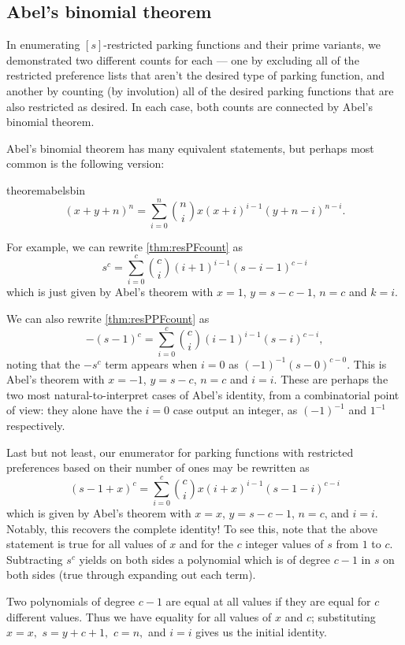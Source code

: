 \documentclass[12 pt]{amsart}
\theoremstyle{definition} %
\theoremstyle{remark} %
\begin{document}
\subsection{Abel's binomial theorem}

In enumerating $[s]$-restricted parking functions and their prime variants, we demonstrated two different counts for each --- one by excluding all of the restricted preference lists that aren't the desired type of parking function, and another by counting (by involution) all of the desired parking functions that are also restricted as desired. In each case, both counts are connected by Abel's binomial theorem.

Abel's binomial theorem has many equivalent statements, but perhaps most common is the following version:

\begin{restatable}{theorem}{abelsbin}
	\[
		(x + y + n)^{n} = \sum_{i = 0}^{n} \binom{n}{i} x (x + i)^{i - 1} (y + n - i)^{n - i}.
	\]
\end{restatable}

For example, we can rewrite \cref{thm:resPFcount} as
\[
	s^{c} = \sum_{i = 0}^{c} \binom{c}{i} (i + 1)^{i - 1} (s - i - 1)^{c - i}
\]
which is just given by Abel's theorem with $x = 1$, $y = s - c - 1$, $n = c$ and $k = i$.

We can also rewrite \cref{thm:resPPFcount} as
\[
    - (s - 1)^{c} = \sum_{i = 0}^{c} \binom{c}{i} (i - 1)^{i - 1} (s - i)^{c - i},
\]
noting that the $-s^c$ term appears when $i=0$ as $(-1)^{-1}(s-0)^{c-0}$. This is Abel's theorem with $x=-1$, $y=s-c$, $n=c$ and $i=i$. These are perhaps the two most natural-to-interpret cases of Abel's identity, from a combinatorial point of view: they alone have the $i=0$ case output an integer, as $(-1)^{-1}$ and $1^{-1}$ respectively.

Last but not least, our enumerator for parking functions with restricted preferences based on their number of ones may be rewritten as 
\[
	   (s - 1 + x)^{c} = \sum_{i = 0}^{c} \binom{c}{i} x(i + x)^{i - 1} (s - 1 - i)^{c - i}
\]
which is given by Abel's theorem with $x=x$, $y=s-c-1$, $n=c$, and $i=i$. Notably, this recovers the complete identity! To see this, note that the above statement is true for all values of $x$ and for the $c$ integer values of $s$ from $1$ to $c$. Subtracting $s^c$ yields on both sides a polynomial which is of degree $c-1$ in $s$ on both sides (true through expanding out each term).

Two polynomials of degree $c-1$ are equal at all values if they are equal for $c$ different values. Thus we have equality for all values of $x$ and $c$; substituting $x=x,$ $s=y+c+1,$ $c=n,$ and $i=i$ gives us the initial identity.
\end{document}
